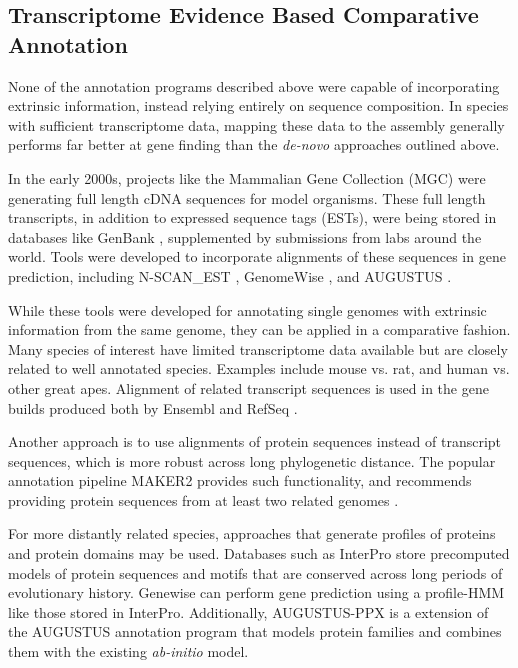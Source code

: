 \documentclass[fleqn,10pt]{wlscirep}
\begin{document}
\subsection{Transcriptome Evidence Based Comparative Annotation}

None of the annotation programs described above were capable of incorporating extrinsic information, instead relying entirely on sequence composition. In species with sufficient transcriptome data, mapping these data to the assembly generally performs far better at gene finding than the \textit{de-novo} approaches outlined above. 

In the early 2000s, projects like the Mammalian Gene Collection (MGC) \cite{mammalian2002generation} were generating full length cDNA sequences for model organisms. These full length transcripts, in addition to expressed sequence tags (ESTs), were being stored in databases like GenBank \cite{benson2000genbank}, supplemented by submissions from labs around the world. Tools were developed to incorporate alignments of these sequences in gene prediction, including N-SCAN\_EST \cite{wei2006using},  GenomeWise \cite{birney2004genewise}, and AUGUSTUS \cite{stanke2008using}.

While these tools were developed for annotating single genomes with extrinsic information from the same genome, they can be applied in a comparative fashion. Many species of interest have limited transcriptome data available but are closely related to well annotated species. Examples include mouse vs. rat, and human vs. other great apes. Alignment of related transcript sequences is used in the gene builds produced both by Ensembl \cite{Aken01012016} and RefSeq \cite{pruitt2006ncbi}.

Another approach is to use alignments of protein sequences instead of transcript sequences, which is more robust across long phylogenetic distance. The popular annotation pipeline MAKER2 \cite{cantarel2008maker} provides such functionality, and recommends providing protein sequences from at least two related genomes \cite{yandell2012beginner}. 

For more distantly related species, approaches that generate profiles of proteins and protein domains may be used. Databases such as InterPro \cite{zdobnov2001interproscan} store precomputed models of protein sequences and motifs that are conserved across long periods of evolutionary history. Genewise \cite{birney2004genewise} can perform gene prediction using a profile-HMM like those stored in InterPro. Additionally, AUGUSTUS-PPX \cite{keller2011novel} is a extension of the AUGUSTUS annotation program that models protein families and combines them with the existing \textit{ab-initio} model.
\end{document}
